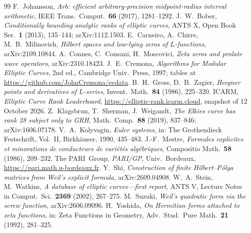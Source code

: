 \documentclass[11pt]{amsart}
\theoremstyle{remark}
\theoremstyle{definition}
\begin{document}
\begin{thebibliography}{99}
 F.~Johansson, \emph{Arb: efficient arbitrary-precision midpoint-radius interval arithmetic}, IEEE Trans.\ Comput.\ \textbf{66} (2017), 1281--1292.
 J.~W.~Bober, \emph{Conditionally bounding analytic ranks of elliptic curves}, ANTS X, Open Book Ser.\ \textbf{1} (2013), 135--144; arXiv:1112.1503.
 E.~Carneiro, A.~Chirre, M.~B.~Milinovich, \emph{Hilbert spaces and low-lying zeros of $L$-functions}, arXiv:2109.10844.
 A.~Connes, C.~Consani, H.~Moscovici, \emph{Zeta zeros and prolate wave operators}, arXiv:2310.18423.
 J.~E.~Cremona, \emph{Algorithms for Modular Elliptic Curves}, 2nd ed., Cambridge Univ.\ Press, 1997; tables at \url{https://github.com/JohnCremona/ecdata}.
 B.~H.~Gross, D.~B.~Zagier, \emph{Heegner points and derivatives of $L$-series}, Invent.\ Math.\ \textbf{84} (1986), 225--320.
 ICARM, \emph{Elliptic Curve Rank Leaderboard}, \url{https://elliptic-rank.icarm.cloud}, snapshot of 12 October 2026.
 Z.~Klagsbrun, T.~Sherman, J.~Weigandt, \emph{The Elkies curve has rank 28 subject only to GRH}, Math.\ Comp.\ \textbf{88} (2019), 837--846; arXiv:1606.07178.
 V.~A.~Kolyvagin, \emph{Euler systems}, in: The Grothendieck Festschrift, Vol.~II, Birkh\"auser, 1990, 435--483.
 J.-F.~Mestre, \emph{Formules explicites et minorations de conducteurs de vari\'et\'es alg\'ebriques}, Compositio Math.\ \textbf{58} (1986), 209--232.
 The PARI~Group, \emph{PARI/GP}, Univ.\ Bordeaux, \url{https://pari.math.u-bordeaux.fr}.
 Y.~Shi, \emph{Construction of finite Hilbert--P\'olya matrices from Weil's explicit formula}, arXiv:2609.04908.
 W.~A.~Stein, M.~Watkins, \emph{A database of elliptic curves---first report}, ANTS V, Lecture Notes in Comput.\ Sci.\ \textbf{2369} (2002), 267--275.
 M.~Suzuki, \emph{Weil's quadratic form via the screw function}, arXiv:2606.09096.
 H.~Yoshida, \emph{On Hermitian forms attached to zeta functions}, in: Zeta Functions in Geometry, Adv.\ Stud.\ Pure Math.\ \textbf{21} (1992), 281--325.
\end{thebibliography}
\end{document}
